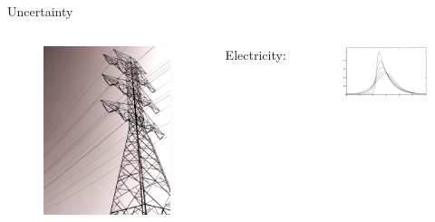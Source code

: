 \begin{frame}{Uncertainty }
\begin{columns}
\begin{figure}[ht]
\includegraphics[width=\textwidth]{images/electricity}
\end{figure}
Electricity:
\begin{figure}[ht]
\includegraphics[width=\textwidth]{images/skew2}
\end{figure}


\end{columns}
\end{frame}
